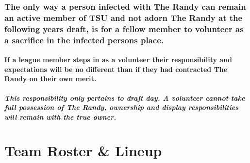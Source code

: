 \documentclass[
]{book}
\begin{document}
\hypertarget{the-only-way-a-person-infected-with-the-randy-can-remain-an-active-member-of-tsu-and-not-adorn-the-randy-at-the-following-years-draft-is-for-a-fellow-member-to-volunteer-as-a-sacrifice-in-the-infected-persons-place.}{%
\subsection{The only way a person infected with The Randy can remain an active member of TSU and not adorn The Randy at the following years draft, is for a fellow member to volunteer as a sacrifice in the infected persons place.}\label{the-only-way-a-person-infected-with-the-randy-can-remain-an-active-member-of-tsu-and-not-adorn-the-randy-at-the-following-years-draft-is-for-a-fellow-member-to-volunteer-as-a-sacrifice-in-the-infected-persons-place.}}

\hypertarget{if-a-league-member-steps-in-as-a-volunteer-their-responsibility-and-expectations-will-be-no-different-than-if-they-had-contracted-the-randy-on-their-own-merit.}{%
\subsubsection{If a league member steps in as a volunteer their responsibility and expectations will be no different than if they had contracted The Randy on their own merit.}\label{if-a-league-member-steps-in-as-a-volunteer-their-responsibility-and-expectations-will-be-no-different-than-if-they-had-contracted-the-randy-on-their-own-merit.}}

\hypertarget{this-responsibility-only-pertains-to-draft-day.-a-volunteer-cannot-take-full-possession-of-the-randy-ownership-and-display-responsibilities-will-remain-with-the-true-owner.}{%
\paragraph{This responsibility only pertains to draft day. A volunteer cannot take full possession of The Randy, ownership and display responsibilities will remain with the true owner.}\label{this-responsibility-only-pertains-to-draft-day.-a-volunteer-cannot-take-full-possession-of-the-randy-ownership-and-display-responsibilities-will-remain-with-the-true-owner.}}

\hypertarget{team-roster-lineup}{%
\chapter{Team Roster \& Lineup}\label{team-roster-lineup}}
\end{document}
